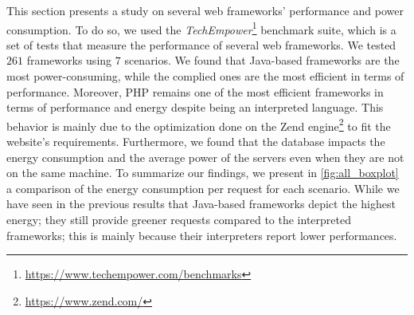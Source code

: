 This section presents a study on several web frameworks' performance and power consumption.
To do so, we used the \emph{TechEmpower}\footnote{\url{https://www.techempower.com/benchmarks}} benchmark suite, which is a set of tests that measure the performance of several web frameworks.
We tested $261$ frameworks using $7$ scenarios.
We found that Java-based frameworks are the most power-consuming, while the complied ones are the most efficient in terms of performance.
Moreover, PHP remains one of the most efficient frameworks in terms of performance and energy despite being an interpreted language.
This behavior is mainly due to the optimization done on the Zend engine\footnote{\url{https://www.zend.com/}} to fit the website's requirements.
Furthermore, we found that the database impacts the energy consumption and the average power of the servers even when they are not on the same machine.
To summarize our findings, we present in \cref{fig:all_boxplot} a comparison of the energy consumption per request for each scenario.
While we have seen in the previous results that Java-based frameworks depict the highest energy; they still provide greener requests compared to the interpreted frameworks; this is mainly because their interpreters report lower performances.


